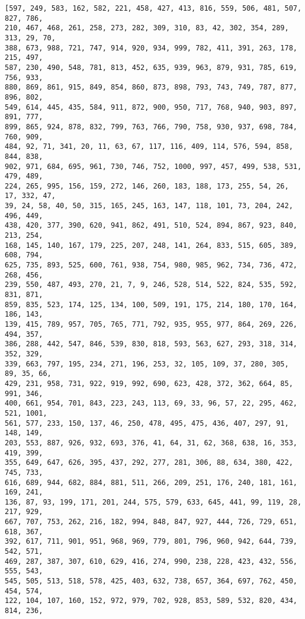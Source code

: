 \documentclass[11pt]{article}
\begin{document}
    \begin{Verbatim}[commandchars=\\\{\}]
[597, 249, 583, 162, 582, 221, 458, 427, 413, 816, 559, 506, 481, 507, 827, 786,
210, 467, 468, 261, 258, 273, 282, 309, 310, 83, 42, 302, 354, 289, 313, 29, 70,
388, 673, 988, 721, 747, 914, 920, 934, 999, 782, 411, 391, 263, 178, 215, 497,
587, 230, 490, 548, 781, 813, 452, 635, 939, 963, 879, 931, 785, 619, 756, 933,
880, 869, 861, 915, 849, 854, 860, 873, 898, 793, 743, 749, 787, 877, 896, 802,
549, 614, 445, 435, 584, 911, 872, 900, 950, 717, 768, 940, 903, 897, 891, 777,
899, 865, 924, 878, 832, 799, 763, 766, 790, 758, 930, 937, 698, 784, 760, 909,
484, 92, 71, 341, 20, 11, 63, 67, 117, 116, 409, 114, 576, 594, 858, 844, 838,
902, 971, 684, 695, 961, 730, 746, 752, 1000, 997, 457, 499, 538, 531, 479, 489,
224, 265, 995, 156, 159, 272, 146, 260, 183, 188, 173, 255, 54, 26, 17, 332, 47,
39, 24, 58, 40, 50, 315, 165, 245, 163, 147, 118, 101, 73, 204, 242, 496, 449,
438, 420, 377, 390, 620, 941, 862, 491, 510, 524, 894, 867, 923, 840, 213, 254,
168, 145, 140, 167, 179, 225, 207, 248, 141, 264, 833, 515, 605, 389, 608, 794,
625, 735, 893, 525, 600, 761, 938, 754, 980, 985, 962, 734, 736, 472, 268, 456,
239, 550, 487, 493, 270, 21, 7, 9, 246, 528, 514, 522, 824, 535, 592, 831, 871,
859, 835, 523, 174, 125, 134, 100, 509, 191, 175, 214, 180, 170, 164, 186, 143,
139, 415, 789, 957, 705, 765, 771, 792, 935, 955, 977, 864, 269, 226, 494, 357,
386, 288, 442, 547, 846, 539, 830, 818, 593, 563, 627, 293, 318, 314, 352, 329,
339, 663, 797, 195, 234, 271, 196, 253, 32, 105, 109, 37, 280, 305, 89, 35, 66,
429, 231, 958, 731, 922, 919, 992, 690, 623, 428, 372, 362, 664, 85, 991, 346,
400, 661, 954, 701, 843, 223, 243, 113, 69, 33, 96, 57, 22, 295, 462, 521, 1001,
561, 577, 233, 150, 137, 46, 250, 478, 495, 475, 436, 407, 297, 91, 148, 149,
203, 553, 887, 926, 932, 693, 376, 41, 64, 31, 62, 368, 638, 16, 353, 419, 399,
355, 649, 647, 626, 395, 437, 292, 277, 281, 306, 88, 634, 380, 422, 745, 733,
616, 689, 944, 682, 884, 881, 511, 266, 209, 251, 176, 240, 181, 161, 169, 241,
136, 87, 93, 199, 171, 201, 244, 575, 579, 633, 645, 441, 99, 119, 28, 217, 929,
667, 707, 753, 262, 216, 182, 994, 848, 847, 927, 444, 726, 729, 651, 618, 367,
392, 617, 711, 901, 951, 968, 969, 779, 801, 796, 960, 942, 644, 739, 542, 571,
469, 287, 387, 307, 610, 629, 416, 274, 990, 238, 228, 423, 432, 556, 555, 543,
545, 505, 513, 518, 578, 425, 403, 632, 738, 657, 364, 697, 762, 450, 454, 574,
122, 104, 107, 160, 152, 972, 979, 702, 928, 853, 589, 532, 820, 434, 814, 236,

\end{Verbatim}
\end{document}
